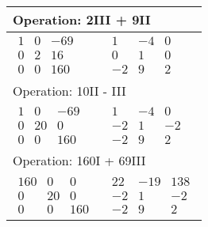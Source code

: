 \begin{longtable}{p{4cm}|p{3cm}}
    \multicolumn{2}{p{\dimexpr4cm+3cm+2\tabcolsep\relax}}{Operation: 2III + 9II} \\\hline\pagebreak[0]
    $\displaystyle\begin{matrix}
        1 & 0 & -69 \\
        0 & 2 & 16 \\
        0 & 0 & 160
    \end{matrix}$&
    $\displaystyle\begin{matrix}
        1 & -4 & 0 \\
        0 & 1 & 0 \\
        -2 & 9 & 2
    \end{matrix}$\\\hline

    \multicolumn{2}{p{\dimexpr4cm+3cm+2\tabcolsep\relax}}{Operation: 10II - III} \\\hline\pagebreak[0]
    $\displaystyle\begin{matrix}
        1 & 0 & -69 \\
        0 & 20 & 0 \\
        0 & 0 & 160
    \end{matrix}$&
    $\displaystyle\begin{matrix}
        1 & -4 & 0 \\
        -2 & 1 & -2 \\
        -2 & 9 & 2
    \end{matrix}$\\\hline
    
    \multicolumn{2}{p{\dimexpr4cm+3cm+2\tabcolsep\relax}}{Operation: 160I + 69III} \\\hline\pagebreak[0]
    $\displaystyle\begin{matrix}
        160 & 0 & 0 \\
        0 & 20 & 0 \\
        0 & 0 & 160
    \end{matrix}$&
    $\displaystyle\begin{matrix}
        22 & -19 & 138 \\
        -2 & 1 & -2 \\
        -2 & 9 & 2
    \end{matrix}$\\\hline


\end{longtable}
